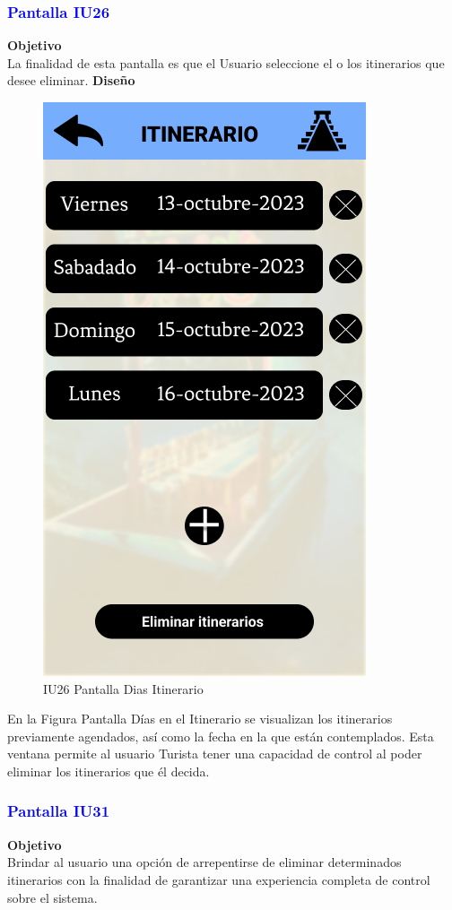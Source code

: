 \newpage
\subsubsection{\textcolor{blue}{Pantalla IU26}}
\textbf{Objetivo} \\
La finalidad de esta pantalla es que el Usuario seleccione el o los itinerarios que desee eliminar.
\vspace{15pt}
\newpage
\textbf{Diseño}
\begin{figure}[htb]
    \centering 
        \includegraphics[width=.5\linewidth]{Pantallas Prototipo3/IU26 Pantalla Dias Itinerario.jpg}
        \caption{IU26 Pantalla Dias Itinerario}
\end{figure}


  
En la Figura Pantalla Días en el Itinerario se visualizan los itinerarios previamente agendados, así como la fecha en la que están contemplados. Esta ventana permite al usuario Turista tener una capacidad de control al poder eliminar los itinerarios que él decida.
\newpage

\subsubsection{\textcolor{blue}{Pantalla IU31}}

\textbf{Objetivo} \\
Brindar al usuario una opción de arrepentirse de eliminar determinados itinerarios con la finalidad de garantizar una experiencia completa de control sobre el sistema.
\vspace{15pt}

